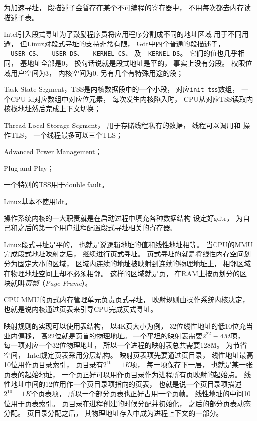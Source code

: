 为加速寻址，
段描述子会暂存在某个不可编程的寄存器中，
不用每次都去内存读描述子表。

Intel引入段式寻址为了鼓励程序员将应用程序分割成不同的地址区域%
用于不同用途，
但Linux对段式寻址的支持非常有限，
Gdt中四个普通的段描述子，
\verb|__USER_CS|、
\verb|__USER_DS|、
\verb|__KERNEL_CS|、
及\verb|__KERNEL_DS|。
它们的值也几乎相同，
基地址全部是0，
换句话说就是段式地址是平的，
事实上没有分段。
权限位域用户空间为3，
内核空间为0.
另有几个有特殊用途的段；
\begin{enumerate*}[label=\itshape\alph*\upshape)]
\item Task State Segment，TSS是内核数据段中的一个小段，
  对应\verb|init_tss|数组，
  一个CPU id对应数组中对应位元素，
  每次发生内核陷入时，
  CPU从对应TSS读取内核栈地址然后完成上下文切换；
\item Thread-Local Storage Segment，
  用于存储线程私有的数据，
  线程可以调用和
  操作TLS，
  一个线程最多可以三个TLS；
\item Advanced Power Management；
\item Plug and Play；
\item 一个特别的TSS用于double fault。
\end{enumerate*}
Linux基本不使用ldt。

操作系统内核的一大职责就是在启动过程中填充各种数据结构
设定好gdtr，
为自己和之后的第一个用户进程配置段式寻址相关的寄存器。

Linux段式寻址是平的，
也就是说逻辑地址的值和线性地址相等。
当CPU的MMU完成段式地址映射之后，
继续进行页式寻址。
页式寻址的就是将线性内存空间划分为固定大小的区域，
区域内连续的地址被映射到连续的物理地址上，
相邻区域在物理地址空间上却不必须相邻。
这样的区域就是页，
在RAM上按页划分的区块就叫{\em 页帧}（{\em Page Frame}）。

CPU MMU的页式内存管理单元负责页式寻址，
映射规则由操作系统内核决定，
也就是说内核通过页表来引导CPU完成页式寻址。

映射规则的实现可以使用表结构，
以4K页大小为例，
32位线性地址的低10位充当业内偏移，
高22位就是页首的物理地址。
一个平坦的映射表需要$2^{22} = 4M$项，
每一项对应一个32位物理地址，
所以一个进程的映射表总共需要128M。
为节省空间，
Intel规定页表采用分层结构。
映射页表项先要通过页目录，
线性地址最高10位用作页目录索引，
页目录有$2^{10} = 1K$项，
每一项保存下一层，
也就是某一张页表的起始地址，
一个页正好可以用作页目录作为进程所有页映射的起始点。
线性地址中间的12位用作一个页目录项指向的页表，
也就是说一个页目录项描述$2^{10} = 1K$个页表项，
所以一个部分页表也正好占用一个页帧。
线性地址的中间10位用于页表索引。
页目录在进程创建的时候分配并初始化，
之后的部分页表动态分配。
页目录分配之后，
其物理地址存入中成为进程上下文的一部分。

